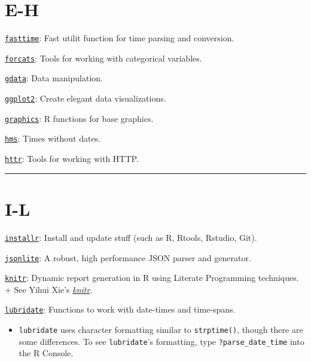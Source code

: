 \documentclass[]{book}
\providecommand{\tightlist}{%
  \setlength{\itemsep}{0pt}\setlength{\parskip}{0pt}}
\theoremstyle{definition}
\theoremstyle{definition}
\theoremstyle{definition}
\theoremstyle{remark}
\begin{document}
\section{E-H}\label{e-h}

\href{https://CRAN.R-project.org/package=fasttime}{\texttt{fasttime}}:
Fast utilit function for time parsing and conversion.

\href{https://CRAN.R-project.org/package=forcats}{\texttt{forcats}}:
Tools for working with categorical variables.

\href{https://CRAN.R-project.org/package=gdata}{\texttt{gdata}}: Data
manipulation.

\href{https://CRAN.R-project.org/package=ggplot2}{\texttt{ggplot2}}:
Create elegant data visualizations.

\href{https://www.rdocumentation.org/packages/graphics/versions/3.5.1}{\texttt{graphics}}:
R functions for base graphics.

\href{https://CRAN.R-project.org/package=hms}{\texttt{hms}}: Times
without dates.

\href{https://CRAN.R-project.org/package=httr}{\texttt{httr}}: Tools for
working with HTTP.

\begin{center}\rule{0.5\linewidth}{\linethickness}\end{center}

\section{I-L}\label{i-l}

\href{https://CRAN.R-project.org/package=installr}{\texttt{installr}}:
Install and update stuff (such as R, Rtools, Rstudio, Git).

\href{https://CRAN.R-project.org/package=jsonlite}{\texttt{jsonlite}}: A
robust, high performance JSON parser and generator.

\href{https://CRAN.R-project.org/package=knitr}{\texttt{knitr}}: Dynamic
report generation in R using Literate Programming techniques. + See
Yihui Xie's \href{http://yihui.name/knitr/}{\emph{knitr}}.

\href{https://CRAN.R-project.org/package=lubridate}{\texttt{lubridate}}:
Functions to work with date-times and time-spans.

\begin{itemize}
\tightlist
\item
  \texttt{lubridate} uses character formatting similar to
  \texttt{strptime()}, though there are some differences. To see
  \texttt{lubridate}'s formatting, type \texttt{?parse\_date\_time} into
  the R Console.
\end{itemize}
\end{document}
